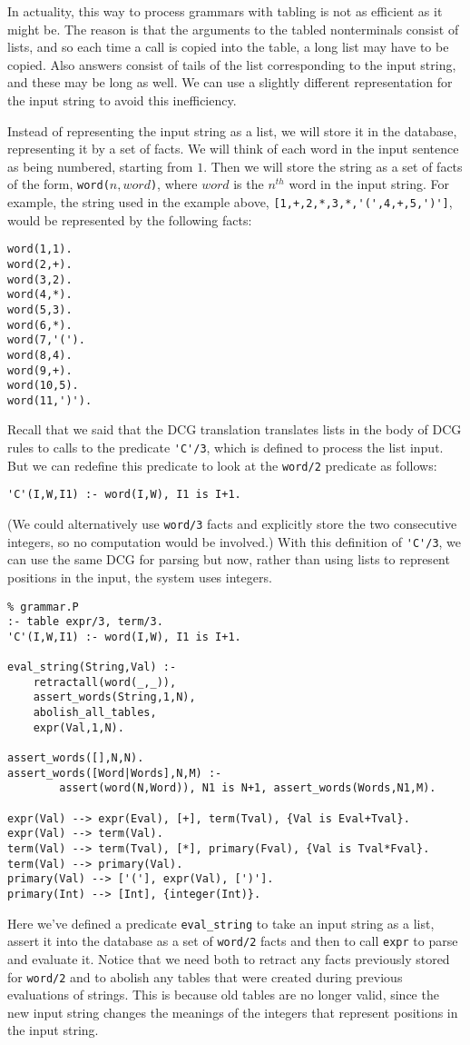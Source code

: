 In actuality, this way to process grammars with tabling is not as
efficient as it might be.  The reason is that the arguments to the
tabled nonterminals consist of lists, and so each time a call is
copied into the table, a long list may have to be copied.  Also
answers consist of tails of the list corresponding to the input
string, and these may be long as well.  We can use a slightly
different representation for the input string to avoid this
inefficiency.

Instead of representing the input string as a list, we will store it
in the database, representing it by a set of facts.  We will think of
each word in the input sentence as being numbered, starting from $1$.
Then we will store the string as a set of facts of the form,
\verb|word(|$n,word$\verb|)|, where $word$ is the $n^{th}$ word in the
input string.  For example, the string used in the example above,
\verb|[1,+,2,*,3,*,'(',4,+,5,')']|, would be represented by the
following facts:
\begin{verbatim}
word(1,1).
word(2,+).
word(3,2).
word(4,*).
word(5,3).
word(6,*).
word(7,'(').
word(8,4).
word(9,+).
word(10,5).
word(11,')').
\end{verbatim}
Recall that we said that the DCG translation translates lists in the
body of DCG rules to calls to the predicate \verb|'C'/3|, which is
defined to process the list input.  But we can redefine this predicate
to look at the \verb|word/2| predicate as follows:
\begin{verbatim}
'C'(I,W,I1) :- word(I,W), I1 is I+1.
\end{verbatim}
(We could alternatively use \verb|word/3| facts and explicitly store
the two consecutive integers, so no computation would be involved.)
With this definition of \verb|'C'/3|, we can use the same DCG for
parsing but now, rather than using lists to represent positions in the
input, the system uses integers.
\begin{verbatim}
% grammar.P
:- table expr/3, term/3.
'C'(I,W,I1) :- word(I,W), I1 is I+1.

eval_string(String,Val) :- 
    retractall(word(_,_)),
    assert_words(String,1,N),
    abolish_all_tables,
    expr(Val,1,N).

assert_words([],N,N).
assert_words([Word|Words],N,M) :- 
        assert(word(N,Word)), N1 is N+1, assert_words(Words,N1,M).

expr(Val) --> expr(Eval), [+], term(Tval), {Val is Eval+Tval}.
expr(Val) --> term(Val).
term(Val) --> term(Tval), [*], primary(Fval), {Val is Tval*Fval}.
term(Val) --> primary(Val).
primary(Val) --> ['('], expr(Val), [')'].
primary(Int) --> [Int], {integer(Int)}.
\end{verbatim}
Here we've defined a predicate \verb|eval_string| to take an input
string as a list, assert it into the database as a set of
\verb|word/2| facts and then to call \verb|expr| to parse and evaluate
it.  Notice that we need both to retract any facts previously stored
for \verb|word/2| and to abolish any tables that were created during
previous evaluations of strings.  This is because old tables are no
longer valid, since the new input string changes the meanings of the
integers that represent positions in the input string.

